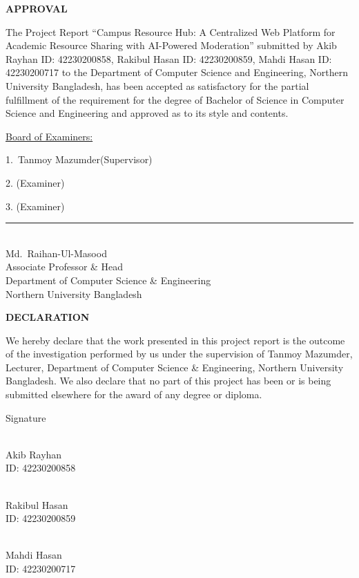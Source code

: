 \documentclass[12pt,a4paper]{report}
\newcommand{\ProjectTitle}{Campus Resource Hub: A Centralized Web Platform for Academic Resource Sharing with AI-Powered Moderation}
\newcommand{\StudentAName}{Akib Rayhan}
\newcommand{\StudentAID}{42230200858}
\newcommand{\StudentBName}{Rakibul Hasan}
\newcommand{\StudentBID}{42230200859}
\newcommand{\StudentCName}{Mahdi Hasan}
\newcommand{\StudentCID}{42230200717}
\newcommand{\SupervisorName}{Tanmoy Mazumder}
\newcommand{\SupervisorRank}{Lecturer}
\newcommand{\DeptHeadName}{Md.\ Raihan-Ul-Masood}
\newcommand{\frontheading}[1]{%
  \begin{center}\textbf{\Large #1}\end{center}\vspace{10pt}}
\begin{document}

\frontheading{APPROVAL}
The Project Report ``\ProjectTitle'' submitted by \StudentAName{}
ID: \StudentAID, \StudentBName{} ID: \StudentBID, \StudentCName{}
ID: \StudentCID{} to the Department of Computer Science and
Engineering, Northern University Bangladesh, has been accepted as
satisfactory for the partial fulfillment of the requirement for the
degree of Bachelor of Science in Computer Science and Engineering and
approved as to its style and contents.

\vspace{1.4cm}
\underline{Board of Examiners:}

\vspace{0.8cm}
1.\ \SupervisorName \hfill (Supervisor)

\vspace{1.6cm}
2. \hfill (Examiner)

\vspace{1.6cm}
3. \hfill (Examiner)

\vfill
\begin{center}
  \rule{6cm}{0.4pt}\\
  \DeptHeadName\\
  Associate Professor \& Head\\
  Department of Computer Science \& Engineering\\
  Northern University Bangladesh
\end{center}
\clearpage

\frontheading{DECLARATION}
We hereby declare that the work presented in this project report is
the outcome of the investigation performed by us under the
supervision of \SupervisorName, \SupervisorRank, Department of
Computer Science \& Engineering, Northern University Bangladesh. We
also declare that no part of this project has been or is being
submitted elsewhere for the award of any degree or diploma.

\vspace{1.4cm}
\begin{center}
  Signature
  \vspace{1.2cm}

  \makebox[0.5\textwidth]{\dotfill}\\
  \StudentAName\\
  ID: \StudentAID
  \vspace{1.2cm}

  \makebox[0.5\textwidth]{\dotfill}\\
  \StudentBName\\
  ID: \StudentBID
  \vspace{1.2cm}

  \makebox[0.5\textwidth]{\dotfill}\\
  \StudentCName\\
  ID: \StudentCID
\end{center}
\clearpage
\end{document}
